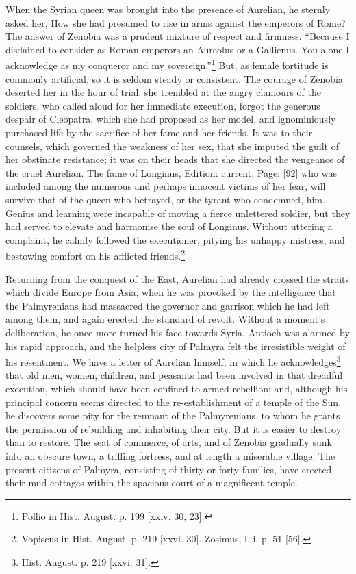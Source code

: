 When the Syrian queen was brought into the presence of Aurelian, he sternly asked her, How she had presumed to rise in arms against the emperors of Rome? The answer of Zenobia was a prudent mixture of respect and firmness. \texthebrew{“}Because I disdained to consider as Roman emperors an Aureolus or a Gallienus. You alone I acknowledge as my conqueror and my sovereign.\texthebrew{}”\footnote{Pollio in Hist. August. p. 199 [xxiv. 30, 23].} But, as female fortitude is commonly artificial, so it is seldom steady or consistent. The courage of Zenobia deserted her in the hour of trial; she trembled at the angry clamours of the soldiers, who called aloud for her immediate execution, forgot the generous despair of Cleopatra, which she had proposed as her model, and ignominiously purchased life by the sacrifice of her fame and her friends. It was to their counsels, which governed the weakness of her sex, that she imputed the guilt of her obstinate resistance; it was on their heads that she directed the vengeance of the cruel Aurelian. The fame of Longinus, Edition: current; Page: [92] who was included among the numerous and perhaps innocent victims of her fear, will survive that of the queen who betrayed, or the tyrant who condemned, him. Genius and learning were incapable of moving a fierce unlettered soldier, but they had served to elevate and harmonise the soul of Longinus. Without uttering a complaint, he calmly followed the executioner, pitying his unhappy mistress, and bestowing comfort on his afflicted friends.\footnote{Vopiscus in Hist. August. p. 219 [xxvi. 30]. Zosimus, l. i. p. 51 [56].}

Returning from the conquest of the East, Aurelian had already crossed the straits which divide Europe from Asia, when he was provoked by the intelligence that the Palmyrenians had massacred the governor and garrison which he had left among them, and again erected the standard of revolt. Without a moment\texthebrew{}’s deliberation, he once more turned his face towards Syria. Antioch was alarmed by his rapid approach, and the helpless city of Palmyra felt the irresistible weight of his resentment. We have a letter of Aurelian himself, in which he acknowledges\footnote{Hist. August. p. 219 [xxvi. 31].} that old men, women, children, and peasants had been involved in that dreadful execution, which should have been confined to armed rebellion; and, although his principal concern seems directed to the re-establishment of a temple of the Sun, he discovers some pity for the remnant of the Palmyrenians, to whom he grants the permission of rebuilding and inhabiting their city. But it is easier to destroy than to restore. The seat of commerce, of arts, and of Zenobia gradually sunk into an obscure town, a trifling fortress, and at length a miserable village. The present citizens of Palmyra, consisting of thirty or forty families, have erected their mud cottages within the spacious court of a magnificent temple.

